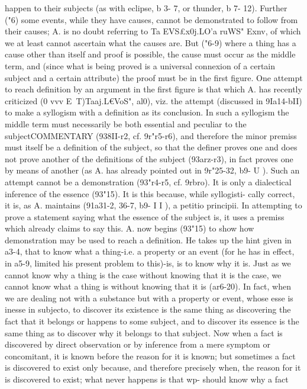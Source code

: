 {{{{{{{{{{{{{{{{{{{{{{{{{{{{{{{happen to their subjects (as with eclipse, b 3- 7, or thunder, b 7- 12).
Further ("6) some events, while they have causes, cannot be
demonstrated to follow from their causes; A. is no doubt referring
to Ta EVS£x0j.LO'a ruWS" Exnv, of which we at least cannot ascertain
what the causes are. But ("6-9) where a thing has a cause other
than itself and proof is possible, the cause must occur as the
middle term, and (since what is being proved is a universal
connexion of a certain subject and a certain attribute) the proof
must be in the first figure.
One attempt to reach definition by an argument in the first
figure is that which A. has recently criticized (0 vvv E~T)Taaj.L€VoS",
al0), viz. the attempt (discussed in 9Ia14-bII) to make a syllogism
with a definition as its conclusion. In such a syllogism the middle
term must necessarily be both essential and peculiar to the subjectCOMMENTARY
(938II-r2, cf. 9r"r5-r6), and therefore the minor premiss must
itself be a definition of the subject, so that the definer proves one
and does not prove another of the definitions of the subject
(93arz-r3), in fact proves one by means of another (as A. has
already pointed out in 9r"25-32, b9- U ). Such an attempt cannot
be a demonstration (93"r4-r5, cf. 9rbro). It is only a dialectical
inference of the essence (93"15). It is this because, while syllogisti-
cally correct, it is, as A. maintains (91a31-2, 36-7, b9- I I ), a petitio
principii. In attempting to prove a statement saying what the
essence of the subject is, it uses a premiss which already claims
to say this.
A. now begins (93"15) to show how demonstration may be used
to reach a definition. He takes up the hint given in a3-4, that to
know what a thing-i.e. a property or an event (for he has in
effect, in a5-9, limited his present problem to this)-is, is to
know why it is. Just as we cannot know why a thing is the case
without knowing that it is the case, we cannot know what a
thing is without knowing that it is (ar6-20). In fact, when we
are dealing not with a substance but with a property or event,
whose esse is inesse in subjecto, to discover its existence is the
same thing as discovering the fact that it belongs or happens
to some subject, and to discover its essence is the same thing
as to discover why it belongs to that subject. Now when a fact
is discovered by direct observation or by inference from a mere
symptom or concomitant, it is known before the reason for it is
known; but sometimes a fact is discovered to exist only because,
and therefore precisely when, the reason for it is discovered to
exist; what never happens is that wp- should know why a fact
}}}}}}}}}}}}}}}}}}}}}}}}}}}}}}}
